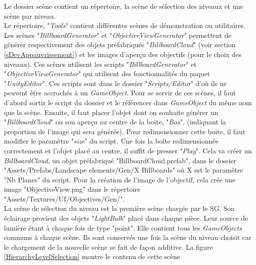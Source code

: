 		Le dossier scène contient un répertoire, la scène de sélection des niveaux et une scène par niveau.
		\\
		
		Le répertoire, "\textit{Tools}" contient différentes scènes de démonstration ou utilitaires. Les scènes "\textit{BillboardGenerator}" et "\textit{ObjectiveViewGenerator}" permettent de générer respectivement des objets préfabriqués "\textit{BillboardCloud}" (voir section \ref{sDevAppauvrissement}) et les images d'aperçu des objectifs (pour le choix des niveaux). Ces scènes utilisent les scripts "\textit{BillboardGenerator}" et "\textit{ObjectiveViewGenerator}" qui utilisent des fonctionnalités du paquet "\textit{UnityEditor}". Ces scripts sont dans le dossier "\textit{Scripts/Editor}" d'où ils ne peuvent être accrochés à un \textit{GameObject}. Pour se servir de ces scènes, il faut d'abord sortir le script du dossier et le référencer dans \textit{GameObject} du même nom que la scène. Ensuite, il faut placer l'objet dont on souhaite générer un "\textit{BillboardCloud}" ou son aperçu au centre de la boite, "\textit{Box}", (indiquant la proportion de l'image qui sera générée). Pour redimensionner cette boite, il faut modifier le paramètre "\textit{size}" du script. Une fois la boîte redimensionnée correctement et l'objet placé au centre, il suffit de presser "\textit{Play}". Cela va créer un \textit{BillboardCloud}, un objet préfabriqué "BillboardCloud.prefab", dans le dossier "Assets/Prefabs/Landscape elements/Gen/X Billboards" où X est le paramètre "Nb Planes" du script. Pour la création de l'image de l'objectif, cela crée une image "ObjectiveView.png" dans le répertoire "Assets/Textures/UI/Objectives/Gen/".
		\\
		
		La scène de sélection du niveau est la première scène chargée par le SG. Son éclairage provient des objets "\textit{LightBulb}" placé dans chaque pièce. Leur source de lumière étant à chaque fois de type "point". Elle contient tous les \textit{GameObjects} communs à chaque scène. Ils sont conservés une fois la scène du niveau choisit car le chargement de la nouvelle scène se fait de façon additive. La figure \ref{HierarchyLevelSelection} montre le contenu de cette scène.\medskip		
		
